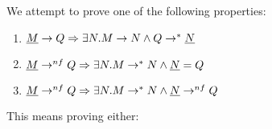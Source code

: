 We attempt to prove one of the following properties:
\begin{enumerate}
  \item $\underline{M} \to Q \Rightarrow \exists N. M \to N \land Q \to^* \underline{N}$
  \item $\underline{M} \to^{nf} Q \Rightarrow \exists N. M \to^* N \land \underline{N} = Q$
  \item $\underline{M} \to^{nf} Q \Rightarrow \exists N. M \to^* N \land \underline{N} \to^{nf} Q$
\end{enumerate}

This means proving either:
